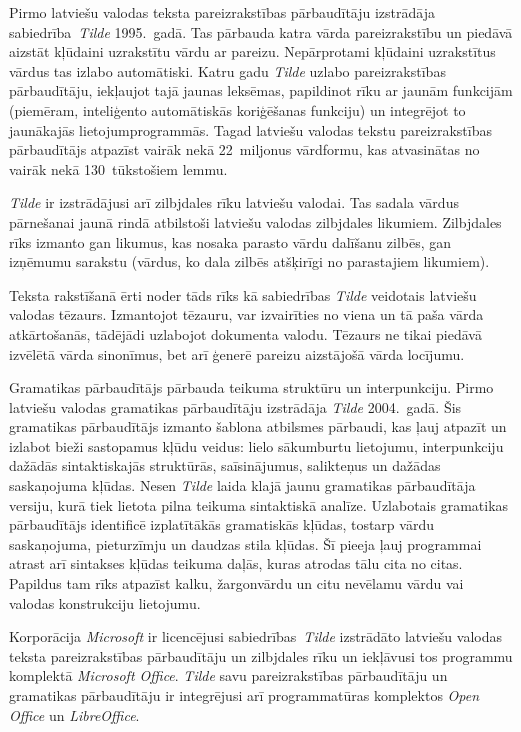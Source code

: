 \begin{multicols}{2}
Pirmo latviešu valodas teksta pareizrakstības pārbaudītāju izstrādāja sabiedrība~\textit{Tilde} 1995.~gadā.
Tas pārbauda katra vārda pareizrakstību un piedāvā aizstāt kļūdaini uzrakstītu vārdu ar pareizu.
Nepārprotami kļūdaini uzrakstītus vārdus tas izlabo automātiski.
Katru gadu \textit{Tilde} uzlabo pareizrakstības pārbaudītāju, iekļaujot tajā jaunas leksēmas, papildinot rīku ar jaunām funkcijām (piemēram, inteliģento automātiskās koriģēšanas funkciju) un integrējot to jaunākajās lietojumprogrammās.
Tagad latviešu valodas tekstu pareizrakstības pārbaudītājs atpazīst vairāk nekā 22~miljonus vārdformu, kas atvasinātas no vairāk nekā 130~tūkstošiem lemmu.

\textit{Tilde} ir izstrādājusi arī zilbjdales rīku latviešu valodai.
Tas sadala vārdus pārnešanai jaunā rindā atbilstoši latviešu valodas zilbjdales likumiem.
Zilbjdales rīks izmanto gan likumus, kas nosaka parasto vārdu dalīšanu zilbēs, gan izņēmumu sarakstu (vārdus, ko dala zilbēs atšķirīgi no parastajiem likumiem). 

Teksta rakstīšanā ērti noder tāds rīks kā sabiedrības \textit{Tilde} veidotais latviešu valodas tēzaurs.
Izmantojot tēzauru, var izvairīties no viena un tā paša vārda atkārtošanās, tādējādi uzlabojot dokumenta valodu.
Tēzaurs ne tikai piedāvā izvēlētā vārda sinonīmus, bet arī ģenerē pareizu aizstājošā vārda locījumu. 

Gramatikas pārbaudītājs pārbauda teikuma struktūru un interpunkciju.
Pirmo latviešu valodas gramatikas pārbaudītāju izstrādāja \textit{Tilde }2004.~gadā.
Šis gramatikas pārbaudītājs izmanto šablona atbilsmes pārbaudi, kas ļauj atpazīt un izlabot bieži sastopamus kļūdu veidus: lielo sākumburtu lietojumu, interpunkciju dažādās sintaktiskajās struktūrās, saīsinājumus, salikteņus un \mbox{dažādas} saskaņojuma kļūdas.
Nesen \textit{Tilde} laida klajā jaunu gramatikas pārbaudītāja versiju, kurā tiek lietota pilna teikuma sintaktiskā analīze.
Uzlabotais gramatikas pārbaudītājs identificē izplatītākās gramatiskās kļūdas, tostarp vārdu saskaņojuma, pieturzīmju un daudzas stila kļūdas.
Šī pieeja ļauj programmai atrast arī sintakses kļūdas teikuma daļās, kuras atrodas tālu cita no citas.
Papildus tam rīks atpazīst kalku, žargonvārdu un citu nevēlamu vārdu vai valodas konstrukciju lietojumu.

Korporācija \textit{Microsoft} ir licencējusi sabiedrības~\textit{Tilde} izstrādāto latviešu valodas teksta pareizrakstības pārbaudītāju un zilbjdales rīku un iekļāvusi tos programmu komplektā \textit{Microsoft Office}.
\textit{Tilde} savu pareizrakstības pārbaudītāju un gramatikas pārbaudītāju ir integrējusi arī programmatūras komplektos \textit{Open Office }un\textit{ LibreOffice}.


\end{multicols}
